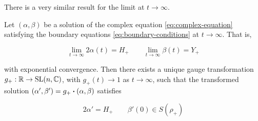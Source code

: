\documentclass{article}
\begin{document}
There is a very similar result for the limit at \(t \to \infty\).

\begin{lemma}
    \label{lem:complex-trajectory-convergence-positive}

    Let \((\alpha, \beta)\) be a solution of the complex equation \cref{eq:complex-equation} satisfying the boundary equations \cref{eq:boundary-conditions} at \(t \to \infty\). That is,

    \[\lim_{t \to \infty}2\alpha(t) = H_+ \qquad \lim_{t \to \infty}\beta(t) = Y_+\]

    with exponential convergence. Then there exists a unique gauge transformation \(g_+ : \mathbb{R} \to \operatorname{SL}(n, \mathbb{C})\), with \(g_+(t) \to 1\) as \(t \to \infty\), such that the transformed solution \((\alpha', \beta') = g_+ \vdot (\alpha, \beta)\) satisfies

    \[2\alpha' = H_+ \qquad \beta'(0) \in S(\rho_+)\]
\end{lemma}
\end{document}
